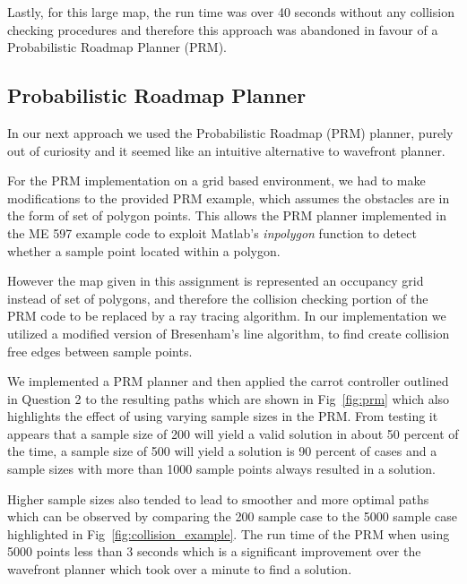 \documentclass{article}
\begin{document}
Lastly, for this large map, the run time was over 40 seconds without any collision checking procedures and therefore this approach was abandoned in favour of a Probabilistic Roadmap Planner (PRM). 


\subsection{Probabilistic Roadmap Planner}
\label{subsec:prm}
In our next approach we used the Probabilistic Roadmap (PRM) planner, purely out of curiosity and it seemed like an intuitive alternative to wavefront planner. 

For the PRM implementation on a grid based environment, we had to make modifications to the provided PRM example, which assumes the obstacles are in the form of set of polygon points. This allows the PRM planner implemented in the ME 597 example code to exploit Matlab's \textit{inpolygon }function to detect whether a sample point located within a polygon. 

However the map given in this assignment is represented an occupancy grid instead of set of polygons, and therefore the collision checking portion of the PRM code to be replaced by a ray tracing algorithm. In our implementation we utilized a modified version of Bresenham's line algorithm, to find create collision free edges between sample points.

We implemented a PRM planner and then applied the carrot controller outlined in Question 2 to the resulting paths which are shown in  Fig~\ref{fig:prm} which also highlights the effect of using varying sample sizes in the PRM. From testing it appears that a sample size of 200 will yield a valid solution in about 50 percent of the time, a sample size of 500 will yield a solution is 90 percent of cases and a sample sizes with more than 1000 sample points always resulted in a solution. 

Higher sample sizes also tended to lead to smoother and more optimal paths which can be observed by comparing  the 200 sample case to the 5000 sample case highlighted in Fig~\ref{fig:collision_example}. The run time of the PRM when using 5000 points less than 3 seconds which is a significant improvement over the wavefront planner which took over a minute to find a solution.  
\end{document}
